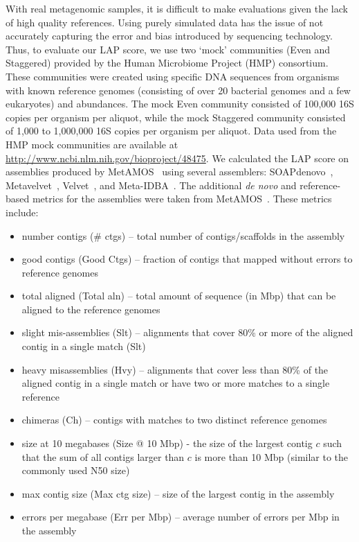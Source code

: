 With real metagenomic samples, it is difficult to make evaluations given the lack of high quality references.
Using purely simulated data has the issue of not accurately capturing the error and bias introduced by sequencing technology.
Thus, to evaluate our LAP score, we use two `mock' communities (Even and Staggered) provided by the Human Microbiome Project (HMP) consortium\cite{mitreva2012structure,methe2012framework}.
These communities were created using specific DNA sequences from organisms with known reference genomes (consisting of over 20 bacterial genomes and a few eukaryotes) and abundances.
The mock Even community consisted of 100,000 16S copies per organism per aliquot, while the mock Staggered community consisted of 1,000 to 1,000,000 16S copies per organism per aliquot.
Data used from the HMP mock communities are available at \url{http://www.ncbi.nlm.nih.gov/bioproject/48475}.
We calculated the LAP score on assemblies produced by MetAMOS~\cite{treangen2013metamos} using several assemblers: SOAPdenovo~\cite{SOAPdenovo}, Metavelvet~\cite{namiki2012metavelvet}, Velvet~\cite{Velvet}, and Meta-IDBA~\cite{peng2011meta}.
The additional \emph{de novo} and reference-based metrics for the assemblies were taken from MetAMOS~\cite{treangen2013metamos}.  These metrics include:
   \begin{itemize}
   \item number contigs (\# ctgs) -- total number of contigs/scaffolds in the assembly
   \item good contigs (Good Ctgs) -- fraction of contigs that mapped without errors to reference genomes
   \item total aligned (Total aln) -- total amount of sequence (in Mbp) that can be aligned to the reference genomes
   \item slight mis-assemblies (Slt) -- alignments that cover 80\% or more of the aligned contig in a single match (Slt)
   \item heavy misassemblies (Hvy) -- alignments that cover less than 80\% of the aligned contig in a single match or have two or more matches to a single reference
   \item chimeras (Ch) -- contigs with matches to two distinct reference genomes
   \item size at 10 megabases (Size @ 10 Mbp) - the size of the largest contig $c$ such that the sum of all contigs larger than $c$ is more than 10 Mbp (similar to the commonly used N50 size)
   \item max contig size (Max ctg size) -- size of the largest contig in the assembly
   \item errors per megabase (Err per Mbp) -- average number of errors per Mbp in the assembly
   \end{itemize}

